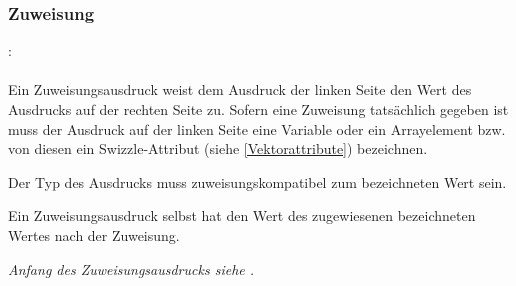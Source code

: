 \subsubsection{Zuweisung}\label{Zuweisung}
:\label{asdr_zuweisung_suffix}\\
\hspace*{1cm}\glq\Gt{=}\grq  {} \\

Ein Zuweisungsausdruck   weist dem Ausdruck der linken Seite den Wert des Ausdrucks
auf der rechten Seite zu. Sofern eine Zuweisung tatsächlich gegeben ist muss
der Ausdruck auf der linken Seite eine Variable oder ein Arrayelement
bzw. von diesen ein Swizzle-Attribut (siehe \ref{Vektorattribute}) bezeichnen.

Der Typ des Ausdrucks muss zuweisungskompatibel zum bezeichneten Wert
sein.

Ein Zuweisungsausdruck selbst hat den Wert des zugewiesenen bezeichneten Wertes nach der Zuweisung.

\emph{Anfang des Zuweisungsausdrucks siehe .}

